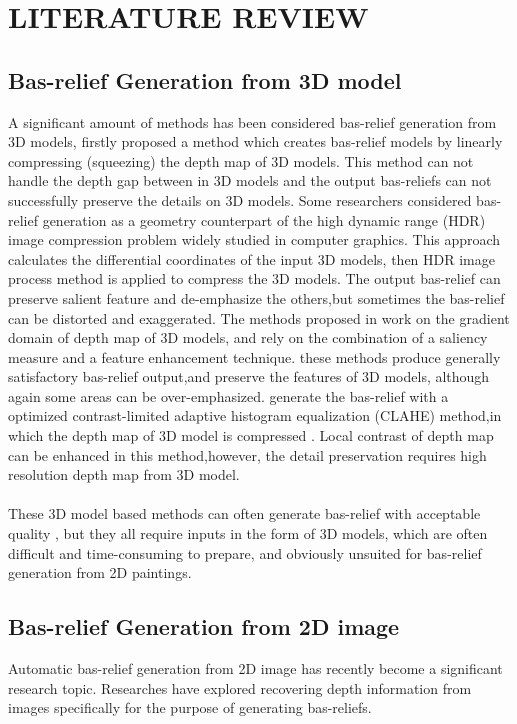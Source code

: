 \chapter{LITERATURE REVIEW}

\section{Bas-relief Generation from 3D model}
A significant amount of methods has been considered bas-relief generation from 3D models,\cite{cignoni1997computer} firstly proposed a method which  creates bas-relief models by linearly compressing (squeezing) the
depth map of 3D models. This method can not handle the depth gap between in 3D models and the output bas-reliefs can not successfully preserve the  details on 3D models. 
Some researchers considered bas-relief generation as a geometry counterpart of the  high dynamic range (HDR) image compression problem widely studied in computer graphics\cite{song2007automatic}. This approach calculates the differential coordinates of the input 3D models, then HDR image process method is applied to compress the 3D models. The output bas-relief can preserve salient feature and de-emphasize the others,but sometimes the bas-relief can be distorted and exaggerated. 
The methods proposed in \cite{kerber2009feature}\cite{kerber2012computer} work on the gradient domain of depth map of 3D models, and rely on the combination of a saliency measure and a feature enhancement technique. these methods produce generally satisfactory bas-relief output,and preserve the features of 3D models, although again some areas can be over-emphasized. 
\cite{sun2009bas} generate the bas-relief with a optimized contrast-limited adaptive histogram equalization (CLAHE) method,in which the depth map of 3D model is compressed . Local contrast of depth map can be enhanced in this method,however, the detail preservation requires high resolution depth map from 3D model. \\ \\ 
These 3D model based methods can often generate bas-relief with acceptable quality , but they all require inputs in the form of 3D models, which are often difficult and time-consuming to prepare, and obviously unsuited for bas-relief generation from 2D paintings. 

\section{Bas-relief Generation from 2D image}
Automatic bas-relief generation from 2D image has recently become a significant research topic. Researches have explored recovering depth information from images specifically for the purpose of generating bas-reliefs.\newline
